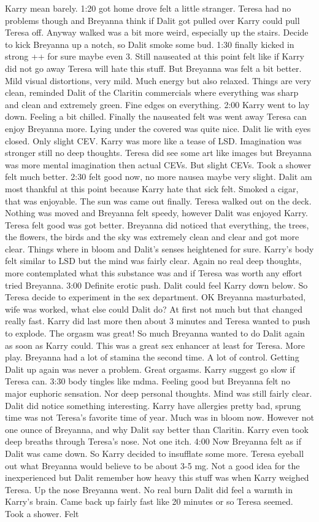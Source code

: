 \documentclass[12pt]{book}
\begin{document}
Karry mean barely. 1:20 got home drove felt a little stranger. Teresa had no problems though and Breyanna think if Dalit got pulled over Karry could pull Teresa off. Anyway walked was a bit more weird, especially up the stairs. Decide to kick Breyanna up a notch, so Dalit smoke some bud. 1:30 finally kicked in strong ++ for sure maybe even 3. Still nauseated at this point felt like if Karry did not go away Teresa will hate this stuff. But Breyanna was felt a bit better. Mild visual distortions, very mild. Much energy but also relaxed. Things are very clean, reminded Dalit of the Claritin commercials where everything was sharp and clean and extremely green. Fine edges on everything. 2:00 Karry went to lay down. Feeling a bit chilled. Finally the nauseated felt was went away Teresa can enjoy Breyanna more. Lying under the covered was quite nice. Dalit lie with eyes closed. Only slight CEV. Karry was more like a tease of LSD. Imagination was stronger still no deep thoughts. Teresa did see some art like images but Breyanna was more mental imagination then actual CEVs. But slight CEVs. Took a shower felt much better. 2:30 felt good now, no more nausea maybe very slight. Dalit am most thankful at this point because Karry hate that sick felt. Smoked a cigar, that was enjoyable. The sun was came out finally. Teresa walked out on the deck. Nothing was moved and Breyanna felt speedy, however Dalit was enjoyed Karry. Teresa felt good was got better. Breyanna did noticed that everything, the trees, the flowers, the birds and the sky was extremely clean and clear and got more clear. Things where in bloom and Dalit's senses heightened for sure. Karry's body felt similar to LSD but the mind was fairly clear. Again no real deep thoughts, more contemplated what this substance was and if Teresa was worth any effort tried Breyanna. 3:00 Definite erotic push. Dalit could feel Karry down below. So Teresa decide to experiment in the sex department. OK Breyanna masturbated, wife was worked, what else could Dalit do? At first not much but that changed really fast. Karry did last more then about 3 minutes and Teresa wanted to push to explode. The orgasm was great! So much Breyanna wanted to do Dalit again as soon as Karry could. This was a great sex enhancer at least for Teresa. More play. Breyanna had a lot of stamina the second time. A lot of control. Getting Dalit up again was never a problem. Great orgasms. Karry suggest go slow if Teresa can. 3:30 body tingles like mdma. Feeling good but Breyanna felt no major euphoric sensation. Nor deep personal thoughts. Mind was still fairly clear. Dalit did notice something interesting. Karry have allergies pretty bad, sprung time was not Teresa's favorite time of year. Much was in bloom now. However not one ounce of Breyanna, and why Dalit say better than Claritin. Karry even took deep breaths through Teresa's nose. Not one itch. 4:00 Now Breyanna felt as if Dalit was came down. So Karry decided to insufflate some more. Teresa eyeball out what Breyanna would believe to be about 3-5 mg. Not a good idea for the inexperienced but Dalit remember how heavy this stuff was when Karry weighed Teresa. Up the nose Breyanna went. No real burn Dalit did feel a warmth in Karry's brain. Came back up fairly fast like 20 minutes or so Teresa seemed. Took a shower. Felt 
\end{document}
